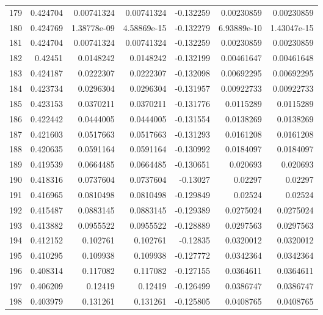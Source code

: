 \begin{tabular}{rrrrrrr}
 179 &  0.424704    & 0.00741324  & 0.00741324  & -0.132259    & 0.00230859  & 0.00230859  \\
 180 &  0.424769    & 1.38778e-09 & 4.58869e-15 & -0.132279    & 6.93889e-10 & 1.43047e-15 \\
 181 &  0.424704    & 0.00741324  & 0.00741324  & -0.132259    & 0.00230859  & 0.00230859  \\
 182 &  0.42451     & 0.0148242   & 0.0148242   & -0.132199    & 0.00461647  & 0.00461648  \\
 183 &  0.424187    & 0.0222307   & 0.0222307   & -0.132098    & 0.00692295  & 0.00692295  \\
 184 &  0.423734    & 0.0296304   & 0.0296304   & -0.131957    & 0.00922733  & 0.00922733  \\
 185 &  0.423153    & 0.0370211   & 0.0370211   & -0.131776    & 0.0115289   & 0.0115289   \\
 186 &  0.422442    & 0.0444005   & 0.0444005   & -0.131554    & 0.0138269   & 0.0138269   \\
 187 &  0.421603    & 0.0517663   & 0.0517663   & -0.131293    & 0.0161208   & 0.0161208   \\
 188 &  0.420635    & 0.0591164   & 0.0591164   & -0.130992    & 0.0184097   & 0.0184097   \\
 189 &  0.419539    & 0.0664485   & 0.0664485   & -0.130651    & 0.020693    & 0.020693    \\
 190 &  0.418316    & 0.0737604   & 0.0737604   & -0.13027     & 0.02297     & 0.02297     \\
 191 &  0.416965    & 0.0810498   & 0.0810498   & -0.129849    & 0.02524     & 0.02524     \\
 192 &  0.415487    & 0.0883145   & 0.0883145   & -0.129389    & 0.0275024   & 0.0275024   \\
 193 &  0.413882    & 0.0955522   & 0.0955522   & -0.128889    & 0.0297563   & 0.0297563   \\
 194 &  0.412152    & 0.102761    & 0.102761    & -0.12835     & 0.0320012   & 0.0320012   \\
 195 &  0.410295    & 0.109938    & 0.109938    & -0.127772    & 0.0342364   & 0.0342364   \\
 196 &  0.408314    & 0.117082    & 0.117082    & -0.127155    & 0.0364611   & 0.0364611   \\
 197 &  0.406209    & 0.12419     & 0.12419     & -0.126499    & 0.0386747   & 0.0386747   \\
 198 &  0.403979    & 0.131261    & 0.131261    & -0.125805    & 0.0408765   & 0.0408765   \\

\end{tabular}
